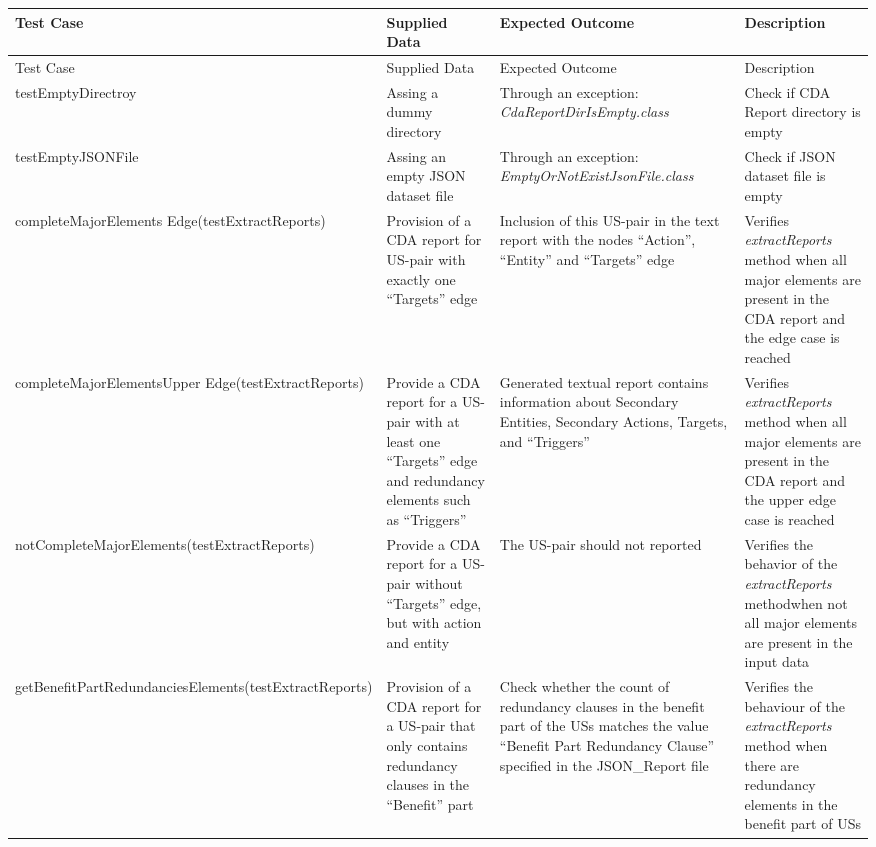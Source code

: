 		\begin{tabularx}{\textwidth}{X  X  X  X}
			
			\hline
			Test Case &Supplied Data&Expected Outcome&Description\\
			\hline\hline
			\endfirsthead
			\hline
			Test Case &Supplied Data&Expected Outcome&Description\\
			\hline\hline
			\endhead
			testEmptyDirectroy&Assing a dummy directory&Through an exception: \textit{CdaReportDirIsEmpty.class}&Check if CDA Report directory is empty\\
			
			testEmptyJSONFile&Assing an empty JSON dataset file&Through an exception: \textit{EmptyOrNotExistJsonFile.class}&Check if JSON dataset file is empty\\
			
			completeMajorElements \newline Edge\newline(testExtractReports)&Provision of a CDA report for US-pair with exactly one \enquote{Targets} edge&Inclusion of this US-pair in the text report with the nodes \enquote{Action}, \enquote{Entity} and \enquote{Targets} edge&Verifies \textit{extractReports} method when all major elements are present in the CDA report and the edge case is reached\\
			
			completeMajorElements\newline Upper Edge\newline(testExtractReports)&Provide a CDA report for a US-pair with at least one \enquote{Targets} edge and redundancy elements such as \enquote{Triggers}&Generated textual report contains information about Secondary Entities, Secondary Actions, Targets, and \enquote{Triggers}&Verifies \textit{extractReports} method when all major elements are present in the CDA report and the upper edge case is reached\\
			
			notCompleteMajor\newline Elements\newline(testExtractReports)&Provide a CDA report for a US-pair without \enquote{Targets} edge, but with action and entity&The US-pair should not reported&Verifies the behavior of the \textit{extractReports} methodwhen not all major elements are present in the input data\\
			
			getBenefitPart\newline RedundanciesElements\newline(testExtractReports)&Provision of a CDA report for a US-pair that only contains redundancy clauses in the \enquote{Benefit} part&Check whether the count of redundancy clauses in the benefit part of the USs matches the value \enquote{Benefit Part Redundancy Clause} specified in the
			JSON\_Report file&Verifies the behaviour of the \textit{extractReports} method when there are redundancy elements in the benefit part of USs\\
			

\end{tabularx}
